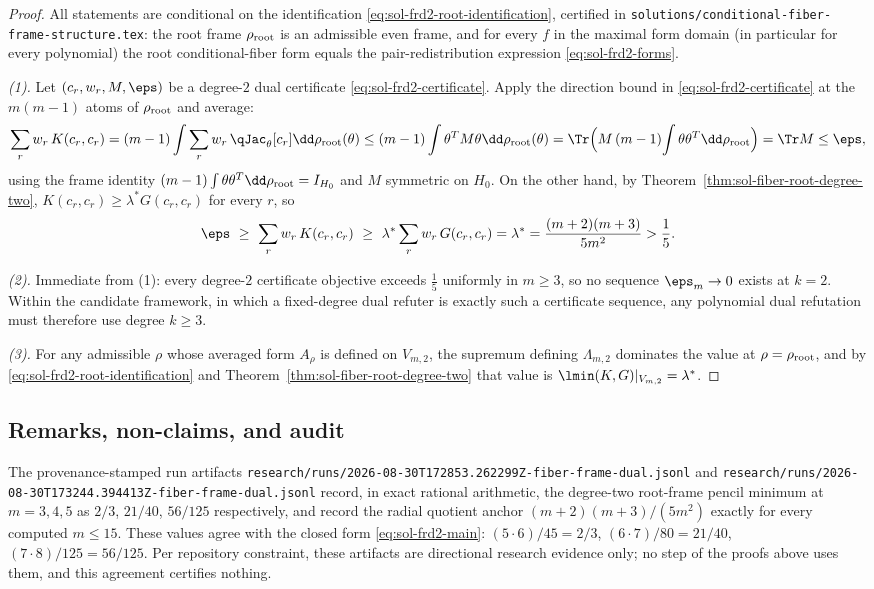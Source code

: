 \documentclass[../main.tex]{subfiles}
\begin{document}
\begin{proof}
All statements are conditional on the identification
\eqref{eq:sol-frd2-root-identification}, certified in
\texttt{solutions/conditional-fiber-frame-structure.tex}: the root frame
$\rho_{\rm root}$ is an admissible even frame, and for every $f$ in the maximal
form domain (in particular for every polynomial) the root conditional-fiber form
equals the pair-redistribution expression \eqref{eq:sol-frd2-forms}.

\emph{(1).}  Let $(c_r,w_r,M,\eps)$ be a degree-$2$ dual certificate
\eqref{eq:sol-frd2-certificate}.  Apply the direction bound in
\eqref{eq:sol-frd2-certificate} at the $m(m-1)$ atoms of $\rho_{\rm root}$ and
average:
\[
  \sum_rw_r\,K(c_r,c_r)
  =(m-1)\int\sum_rw_r\,\qJac_\theta[c_r]\dd\rho_{\rm root}(\theta)
  \le(m-1)\int\theta^TM\theta\dd\rho_{\rm root}(\theta)
  =\Tr\Bigl(M\,(m-1)\!\int\theta\theta^T\dd\rho_{\rm root}\Bigr)
  =\Tr M\le\eps,
\]
using the frame identity $(m-1)\int\theta\theta^T\dd\rho_{\rm root}=I_{H_0}$ and
$M$ symmetric on $H_0$.  On the other hand, by
Theorem~\ref{thm:sol-fiber-root-degree-two},
$K(c_r,c_r)\ge\lambda^*G(c_r,c_r)$ for every $r$, so
\[
  \eps\ \ge\ \sum_rw_r\,K(c_r,c_r)
  \ \ge\ \lambda^*\sum_rw_r\,G(c_r,c_r)=\lambda^*
  =\frac{(m+2)(m+3)}{5m^2}>\frac15 .
\]

\emph{(2).}  Immediate from (1): every degree-$2$ certificate objective exceeds
$\tfrac15$ uniformly in $m\ge3$, so no sequence $\eps_m\to0$ exists at $k=2$.
Within the candidate framework, in which a fixed-degree dual refuter is exactly
such a certificate sequence, any polynomial dual refutation must therefore use
degree $k\ge3$.

\emph{(3).}  For any admissible $\rho$ whose averaged form $A_\rho$ is defined on
$V_{m,2}$, the supremum defining $\Lambda_{m,2}$ dominates the value at
$\rho=\rho_{\rm root}$, and by \eqref{eq:sol-frd2-root-identification} and
Theorem~\ref{thm:sol-fiber-root-degree-two} that value is
$\lmin(K,G)|_{V_{m,2}}=\lambda^*$.
\end{proof}

\subsection*{Remarks, non-claims, and audit}

\begin{remark}
\label{rem:sol-frd2-artifacts}
The provenance-stamped run artifacts
\texttt{research/runs/2026-08-30T172853.262299Z-fiber-frame-dual.jsonl} and
\texttt{research/runs/2026-08-30T173244.394413Z-fiber-frame-dual.jsonl} record, in
exact rational arithmetic, the degree-two root-frame pencil minimum at
$m=3,4,5$ as $2/3$, $21/40$, $56/125$ respectively, and record the radial
quotient anchor $(m+2)(m+3)/(5m^2)$ exactly for every computed $m\le15$.  These
values agree with the closed form \eqref{eq:sol-frd2-main}:
$(5\cdot6)/45=2/3$, $(6\cdot7)/80=21/40$, $(7\cdot8)/125=56/125$.  Per repository
constraint, these artifacts are directional research evidence only; no step of the
proofs above uses them, and this agreement certifies nothing.
\end{remark}
\end{document}
